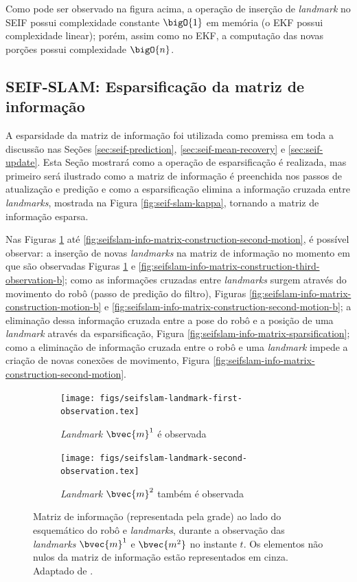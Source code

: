 Como pode ser observado na figura acima, a operação de inserção de \textit{landmark} no SEIF possui complexidade constante $\bigO{1}$ em memória (o EKF possui complexidade linear); porém, assim como no EKF, a computação das 
novas porções possui complexidade $\bigO{n}$.

\subsection{SEIF-SLAM: Esparsificação da matriz de informação}
A esparsidade da matriz de informação foi utilizada como premissa em 
toda a discussão nas Seções \ref{sec:seif-prediction}, \ref{sec:seif-mean-recovery} e \ref{sec:seif-update}. Esta Seção mostrará como a operação de esparsificação é realizada, mas primeiro será 
ilustrado como a matriz de informação é preenchida nos passos de 
atualização e predição e como a esparsificação elimina a informação 
cruzada entre \textit{landmarks}, mostrada na Figura \ref{fig:seif-slam-kappa}, tornando a matriz de informação esparsa.

Nas Figuras \ref{fig:seifslam-info-matrix-construction-observation} até \ref{fig:seifslam-info-matrix-construction-second-motion}, é possível 
observar: a inserção de novas \textit{landmarks} na matriz de informação no momento em que são observadas Figuras \ref{fig:seifslam-info-matrix-construction-observation} e \ref{fig:seifslam-info-matrix-construction-third-observation-b}; como as 
informações cruzadas entre \textit{landmarks} surgem através do 
movimento do robô (passo de predição do filtro), Figuras \ref{fig:seifslam-info-matrix-construction-motion-b} e \ref{fig:seifslam-info-matrix-construction-second-motion-b}; a 
eliminação dessa informação cruzada entre a pose do robô e a posição de uma \textit{landmark} através da esparsificação, Figura \ref{fig:seifslam-info-matrix-sparsification}; como a eliminação de 
informação cruzada entre o robô e uma \textit{landmark} impede a criação de novas conexões de movimento, Figura \ref{fig:seifslam-info-matrix-construction-second-motion}.

\begin{figure}[h]
  \begin{subfigure}{0.475\textwidth}
    \texttt{[image: figs/seifslam-landmark-first-observation.tex]} 
    \caption{\textit{Landmark} $\bvec{m}^1$ é observada}
  \end{subfigure}
  \hfill
  \begin{subfigure}{0.475\textwidth}
    \texttt{[image: figs/seifslam-landmark-second-observation.tex]}
    \caption{\textit{Landmark} $\bvec{m}^2$ também é observada}
  \end{subfigure}
  \caption[Elementos da matriz de informação durante a observação de dois \textit{landmarks}]{Matriz de informação (representada pela grade) ao lado do esquemático do robô e \textit{landmarks}, durante a observação das 
  \textit{landmarks} $\bvec{m}^1$ e $\bvec{m^2}$ no instante $t$. Os elementos não nulos da matriz de informação estão representados em cinza. Adaptado de \cite[p.~389]{thrun2005probabilistic}.}
  \label{fig:seifslam-info-matrix-construction-observation}
\end{figure}


